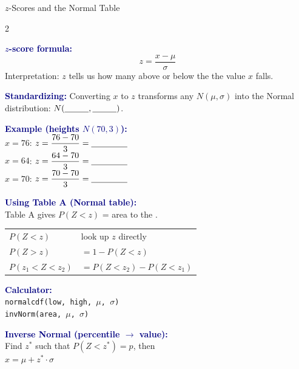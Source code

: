 \documentclass[10pt]{article}
\begin{document}
\begin{notesbox}{$z$-Scores and the Normal Table}
\small
\begin{multicols}{2}

\textbf{\textcolor{navy}{$z$-score formula:}}
\[
  z = \dfrac{x - \mu}{\sigma}
\]
Interpretation: $z$ tells us how many \blank{3cm}
above or below the \blank{1.5cm} the value $x$ falls.

\vspace{5pt}
\textbf{\textcolor{navy}{Standardizing:}} Converting $x$ to $z$ transforms
any $N(\mu, \sigma)$ into the \blank{3cm}
Normal distribution: $N(\blank{1cm},\blank{1cm})$.

\vspace{5pt}
\textbf{\textcolor{navy}{Example (heights $N(70,3)$):}}\\
$x = 76$: $z = \dfrac{76-70}{3} = \blank{1.5cm}$\\[4pt]
$x = 64$: $z = \dfrac{64-70}{3} = \blank{1.5cm}$\\[4pt]
$x = 70$: $z = \dfrac{70-70}{3} = \blank{1.5cm}$

\columnbreak

\textbf{\textcolor{navy}{Using Table A (Normal table):}}\\
Table A gives $P(Z < z)$ = area to the \blank{1.5cm}.

\vspace{4pt}
\renewcommand{\arraystretch}{1.5}
\begin{tabular}{@{}l l@{}}
$P(Z < z)$        & look up $z$ directly \\
$P(Z > z)$        & $= 1 - P(Z < z)$ \\
$P(z_1 < Z < z_2)$ & $= P(Z < z_2) - P(Z < z_1)$ \\
\end{tabular}

\vspace{6pt}
\textbf{\textcolor{navy}{Calculator:}}\\
\texttt{normalcdf(low, high, $\mu$, $\sigma$)}\\
\texttt{invNorm(area, $\mu$, $\sigma$)}

\vspace{6pt}
\textbf{\textcolor{navy}{Inverse Normal (percentile $\to$ value):}}\\
Find $z^*$ such that $P(Z < z^*) = p$, then\\
$x = \mu + z^* \cdot \sigma$

\end{multicols}
\end{notesbox}
\end{document}
